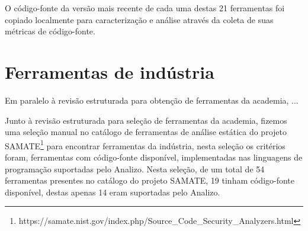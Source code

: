 O código-fonte da versão mais recente de cada uma destas 21 ferramentas foi
copiado localmente para caracterização e análise através da coleta de suas
métricas de código-fonte.


\section{Ferramentas de indústria}

Em paralelo à revisão estruturada para obtenção de ferramentas da academia, ...

Junto à revisão estruturada para seleção de ferramentas da academia, fizemos
uma seleção manual no catálogo de ferramentas de análise estática do projeto
SAMATE\footnote{https://samate.nist.gov/index.php/Source\_Code\_Security\_Analyzers.html}
para encontrar ferramentas da indústria, nesta seleção os critérios foram,
ferramentas com código-fonte disponível, implementadas nas linguagens de
programação suportadas pelo Analizo. Nesta seleção, de um total de 54 ferramentas
presentes no catálogo do projeto SAMATE, 19 tinham código-fonte
disponível, destas apenas 14 eram suportadas pelo Analizo.
